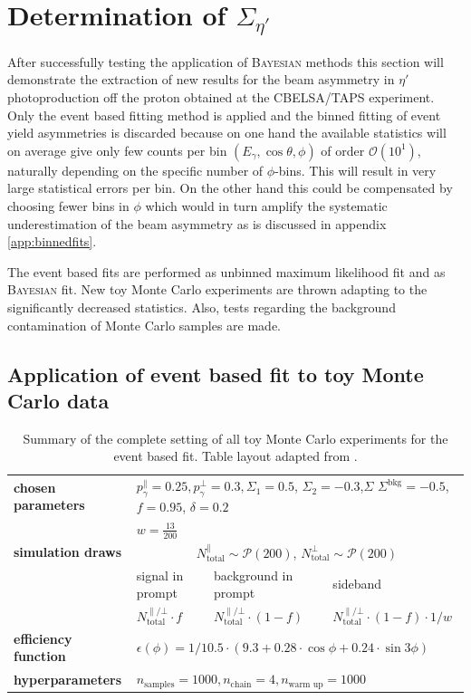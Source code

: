 \section{Determination of $\Sigma_{\eta'}$}
\label{sec:sigma_etap}
After successfully testing the application of \textsc{Bayesian} methods this section will demonstrate the extraction of new results for the beam asymmetry in $\eta'$ photoproduction off the proton obtained at the CBELSA/TAPS experiment. Only the event based fitting method is applied and the binned fitting of event yield asymmetries is discarded because on one hand the available statistics will on average give only few counts per bin $\left(E_\gamma,\cos\theta,\phi\right)$ of order $\mathcal{O}\left(10^1\right)$, naturally depending on the specific number of $\phi$-bins. This will result in very large statistical errors per bin. On the other hand this could be compensated by choosing fewer bins in $\phi$ which would in turn amplify the systematic underestimation of the beam asymmetry as is discussed in appendix \ref{app:binnedfits}.

The event based fits are performed as unbinned maximum likelihood fit and as \textsc{Bayesian} fit. New toy Monte Carlo experiments are thrown adapting to the significantly decreased statistics. Also, tests regarding the background contamination of Monte Carlo samples are made.   
\subsection{Application of event based fit to toy Monte Carlo data}
\begin{table}[htbp]
	
	\renewcommand{\arraystretch}{1.5}
	\centering
	\begin{tabularx}{\linewidth}{l|XXX}
		\toprule
		\textbf{chosen parameters} & \multicolumn{3}{l}{$p_\gamma^\parallel=0.25,p_\gamma^\bot=0.3,\Sigma_1=0.5$, $\Sigma_2=-0.3$,$\Sigma$ $\Sigma^\text{bkg}=-0.5$, $f=0.95$, $\delta=0.2$}\\ &\multicolumn{3}{l}{$w=\frac{13}{200}$}\\
		\hline
		\textbf{simulation draws} &\multicolumn{3}{c}{$ N^\parallel_{\text{total}}\sim\mathcal{P}(200)$, $ N^\bot_{\text{total}}\sim\mathcal{P}(200)$}\\
		\cline{2-4}
		&signal in prompt&background in prompt& sideband \\
		&$N^{\parallel/\bot}_\text{total}\cdot f$&$N^{\parallel/\bot}_\text{total}\cdot\left(1-f\right)$&$N^{\parallel/\bot}_\text{total}\cdot\left(1-f\right)\cdot1/w$\\
		\hline
		\textbf{efficiency function}&\multicolumn{3}{l}{$\epsilon\left(\phi\right)=1/10.5\cdot\left(9.3+0.28\cdot\cos\phi+0.24\cdot\sin3\phi\right)$}\\
		\hline
		\textbf{hyperparameters}&\multicolumn{3}{l}{$n_\text{samples}=1000,n_\text{chain}=4,n_\text{warm up}=1000$}\\
		\bottomrule
	\end{tabularx}
	\caption{Summary of the complete setting of all toy Monte Carlo experiments for the event based fit. Table layout adapted from \cite{farahphd}.}
	\label{tab:mcsum1}
\end{table}
